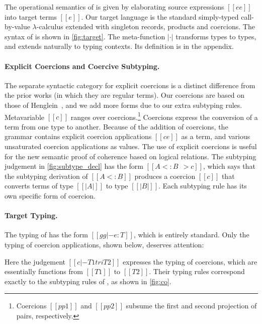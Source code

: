 The operational semantics of \name is given by elaborating source expressions
$[[ee]]$ into target terms $[[e]]$. Our target language \tname is the standard
simply-typed call-by-value $\lambda$-calculus extended with singleton records,
products and coercions. The syntax of \tname is shown in \cref{fig:target}. The
meta-function $| \cdot |$ transforms \name types to \tname types, and extends
naturally to typing contexts. Its definition is in the appendix.


\paragraph{Explicit Coercions and Coercive Subtyping.}

The separate syntactic category for explicit coercions is a distinct
difference from the prior works (in which they are regular terms). Our coercions
are based on those of Henglein~\cite{Henglein_1994}, and we add more forms due to our
extra subtyping rules.
Metavariable $[[c]]$ ranges over coercions.\footnote{Coercions $[[pp1]]$ and $[[pp2]]$ subsume the first and second projection of pairs, respectively.}
Coercions express the conversion
of a term from one type to another. Because of the addition of coercions, the
grammar contains explicit coercion applications $[[c e]]$ as a term, and various
unsaturated coercion applications as values. The use of explicit coercions is useful for the new semantic
proof of coherence based on logical relations.
The subtyping judgement in \cref{fig:subtype_decl} has the form $[[A <: B ~~> c]]$, which says that the
subtyping derivation of $[[A <: B]]$ produces a coercion $[[c]]$ that converts
terms of type $[[ |A| ]]$ to type $[[ |B| ]]$. Each subtyping rule has its own
specific form of coercion.



\paragraph{Target Typing.}
The typing of \tname has the form $[[gg |- e : T]]$, which is entirely standard. Only the typing of coercion
applications, shown below, deserves attention:
\begin{mathpar}
\end{mathpar}
Here the judgement $[[c |- T1 tri T2]]$ expresses the typing of coercions, which
are essentially functions from $[[T1]]$ to $[[T2]]$. Their typing
rules correspond exactly to the subtyping rules of \name, as
shown in \cref{fig:co}.

